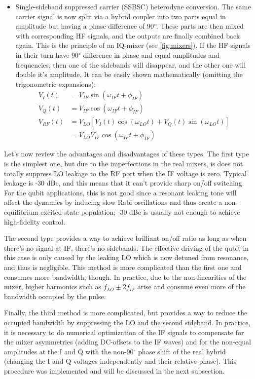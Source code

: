 \begin{itemize}[topsep=5pt, itemsep=5pt]
\item Single-sideband suppressed carrier (SSBSC) heterodyne conversion. The same carrier signal is now split via a hybrid coupler into two parts equal in amplitude but having a phase difference of 90$^\circ$. These parts are then mixed with corresponding HF signals, and the outputs are finally combined back again. This is the principle of an IQ-mixer (see \autoref{fig:mixers}). If the HF signals in their turn have 90$^\circ$ difference in phase and equal amplitudes and frequencies, then one of the sidebands will disappear, and the other one will double it's amplitude. It can be easily shown mathematically (omitting the trigonometric expansions):
\[
\begin{aligned}
V_I(t) &= V_{IF}\sin(\omega_{IF} t+ \phi_{IF})\\
V_Q(t) &= V_{IF}\cos(\omega_{IF} t+ \phi_{IF})\\
V_{RF}(t) &= V_{LO} [V_I(t)\cos(\omega_{LO}t)+V_Q(t)\sin(\omega_{LO}t)]  \\
&= V_{LO} V_{IF} \cos(\omega_{IF}t+\phi_{IF} )
\end{aligned}
\]
\end{itemize}
%

Let's now review the advantages and disadvantages of these types. The first type is the simplest one, but due to the imperfections in the real mixers, is does not totally suppress LO leakage to the RF port when the IF voltage is zero. Typical leakage is -30 dBc, and this means that it can't provide sharp on/off switching. For the qubit applications, this is not good since a resonant leaking tone will affect the dynamics by inducing slow Rabi oscillations and thus create a non-equilibrium excited state population; -30 dBc is usually not enough to achieve high-fidelity control.

The second type provides a way to achieve brilliant on/off ratio as long as when there's no signal at IF, there's no sidebands. The effective driving of the qubit in this case is only caused by the leaking LO which is now detuned from resonance, and thus is negligible. This method is more complicated than the first one and consumes more bandwidth, though.  In practice, due to the non-linearities of the mixer, higher harmonics such as $f_{LO} \pm 2 f_{IF}$ arise and consume even more of the bandwidth occupied by the pulse.

Finally, the third method is more complicated, but provides a way to reduce the occupied bandwidth by suppressing the LO and the second sideband. In practice, it is necessary to do numerical optimization of the IF signals to compensate for the mixer asymmetries (adding DC-offsets to the IF waves) and for the non-equal amplitudes at the I and Q with the non-90$^\circ$ phase shift of the real hybrid (changing the I and Q voltages independently and their relative phase). This procedure was implemented and will be discussed in the next subsection.

